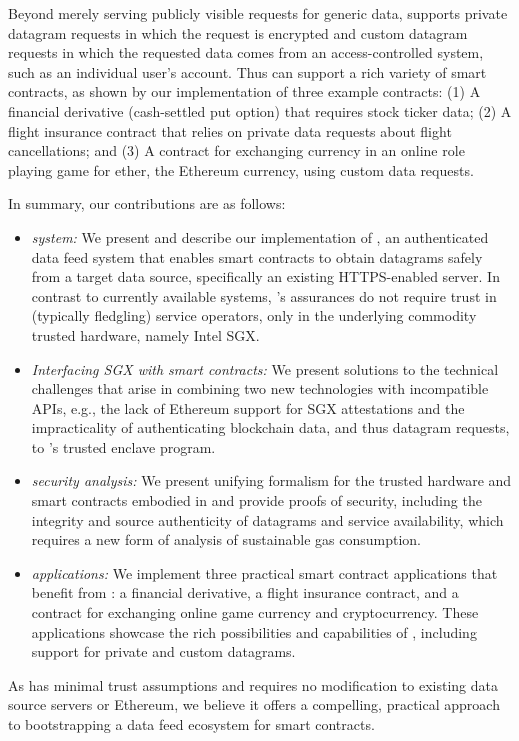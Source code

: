 Beyond merely serving publicly visible requests for generic data, \tc supports private datagram requests in which the request is encrypted and custom datagram requests in which the requested data comes from an access-controlled system, such as an individual user's account. Thus \tc can support a rich variety of smart contracts, as shown by our implementation of three example contracts: (1) A financial derivative (cash-settled put option) that requires stock ticker data; (2) A flight insurance contract that relies on private data requests about flight cancellations; and (3) A contract for exchanging currency in an online role playing game  for ether, the Ethereum currency, using custom data requests.

 
In summary, our contributions are as follows:

\vspace{-1mm}
\begin{itemize}
  \setlength{\itemsep}{2pt}
  \setlength{\parskip}{0pt}
  \setlength{\parsep}{0pt}

\item \emph{\tcs system:} We present and describe our implementation of \tc, an authenticated data feed system that enables smart contracts to obtain datagrams safely from a target data source, specifically an existing HTTPS-enabled server. In contrast to currently available systems, \tc's assurances do not require trust in (typically fledgling) service operators, only in the underlying commodity trusted hardware, namely Intel SGX. 

\item \emph{Interfacing SGX with smart contracts:} We present solutions to the technical challenges that arise in combining two new technologies with incompatible APIs, e.g., the lack of Ethereum support for SGX attestations and the impracticality of authenticating blockchain data, and thus datagram requests, to \tc's trusted enclave program. 

\item \emph{\tc security analysis:} We present unifying formalism for the trusted hardware and smart contracts embodied in \tc and provide proofs of security, including the integrity and source authenticity of datagrams and service availability, which requires a new form of analysis of sustainable gas consumption. 

\item \emph{\tc applications:} We implement three practical smart contract applications that benefit from \tc: a financial derivative, a flight insurance contract, and a contract for exchanging online game currency and cryptocurrency. These applications showcase the rich possibilities and capabilities of \tc, including support for private and custom datagrams. 

\end{itemize}

As \tc has minimal trust assumptions and requires no modification to existing data source servers or Ethereum, we believe it offers a compelling, practical approach to bootstrapping a data feed ecosystem for smart contracts.


